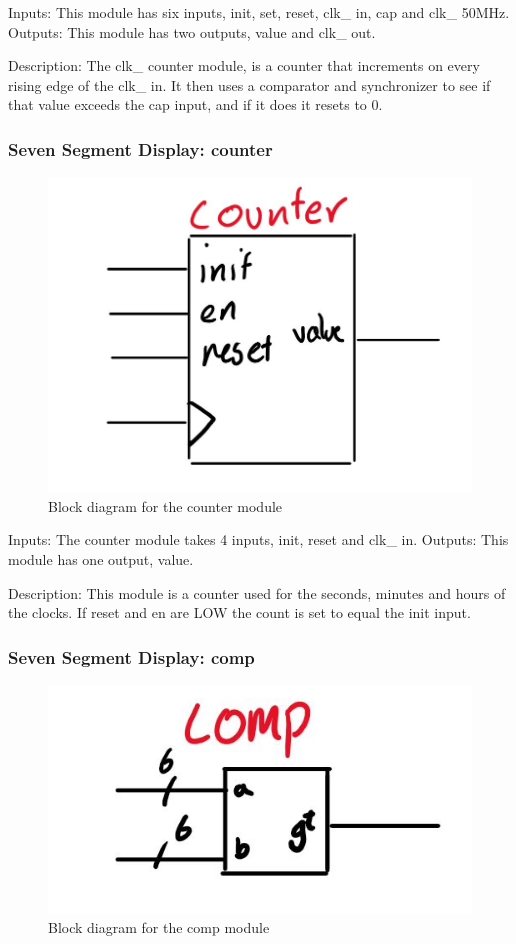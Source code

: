 \documentclass[a4paper]{article}
\begin{document}
Inputs: This module has six inputs, init, set, reset, clk\_ in, cap and clk\_ 50MHz.
Outputs: This module has two outputs, value and clk\_ out.

Description: The clk\_ counter module, is a counter that increments on every rising edge of the clk\_ in. It then uses a comparator and synchronizer to see if that value exceeds the cap input, and if it does it resets to 0.

\subsubsection{Seven Segment Display: counter}
\begin{figure}[H]
    \includegraphics[width=0.8 \linewidth]{images/counter.JPG}
    \caption{Block diagram for the counter module}
    \label{counter}
\end{figure}

Inputs: The counter module takes 4 inputs, init, reset and clk\_ in.
Outputs: This module has one output, value.

Description: This module is a counter used for the seconds, minutes and hours of the clocks. If reset and en are LOW the count is set to equal the init input.

\subsubsection{Seven Segment Display: comp}
\begin{figure}[H]
    \includegraphics[width=0.8 \linewidth]{images/comp.JPG}
    \caption{Block diagram for the comp module}
    \label{comp}
\end{figure}
\end{document}
